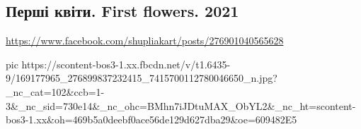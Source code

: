  
 
 
 
 

\subsection{Перші квіти. First flowers. 2021}
\label{sec:05_04_2021.fb.shupliakart.1.pershi_kvity}
\url{https://www.facebook.com/shupliakart/posts/276901040565628}

\ifcmt
  pic https://scontent-bos3-1.xx.fbcdn.net/v/t1.6435-9/169177965_276899837232415_7415700112780046650_n.jpg?_nc_cat=102&ccb=1-3&_nc_sid=730e14&_nc_ohc=BMhn7iJDtuMAX_ObYL2&_nc_ht=scontent-bos3-1.xx&oh=469b5a0deebf0ace56de129d627dba29&oe=609482E5
\fi

